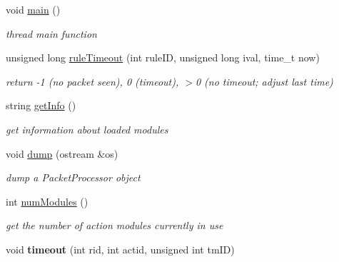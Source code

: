 \begin{DoxyCompactItemize}
\mbox{\label{classQOSProcessor_aa8c0438112f94a3ac43a67897dc5031b}} 
void \hyperlink{classQOSProcessor_aa8c0438112f94a3ac43a67897dc5031b}{main} ()
\begin{DoxyCompactList}\small\item\em thread main function \end{DoxyCompactList}\item 
unsigned long \hyperlink{classQOSProcessor_a5c5fe6cac6644de9a8ef1f767ceab078}{rule\+Timeout} (int rule\+ID, unsigned long ival, time\+\_\+t now)
\begin{DoxyCompactList}\small\item\em return -\/1 (no packet seen), 0 (timeout), $>$0 (no timeout; adjust last time) \end{DoxyCompactList}\item 
\mbox{\label{classQOSProcessor_a28dc4f55ef2a7f9ce115e89cbc961725}} 
string \hyperlink{classQOSProcessor_a28dc4f55ef2a7f9ce115e89cbc961725}{get\+Info} ()
\begin{DoxyCompactList}\small\item\em get information about loaded modules \end{DoxyCompactList}\item 
\mbox{\label{classQOSProcessor_a8b82498d97f1c971442fa91554916aa8}} 
void \hyperlink{classQOSProcessor_a8b82498d97f1c971442fa91554916aa8}{dump} (ostream \&os)
\begin{DoxyCompactList}\small\item\em dump a Packet\+Processor object \end{DoxyCompactList}\item 
\mbox{\label{classQOSProcessor_a75d32434a5b264d1d25e1d4e047bfbcc}} 
int \hyperlink{classQOSProcessor_a75d32434a5b264d1d25e1d4e047bfbcc}{num\+Modules} ()
\begin{DoxyCompactList}\small\item\em get the number of action modules currently in use \end{DoxyCompactList}\item 
\mbox{\label{classQOSProcessor_ac40c582964aa24aa2bc4feb028eaa2b0}} 
void {\bfseries timeout} (int rid, int actid, unsigned int tm\+ID)
\item 

\end{DoxyCompactItemize}
